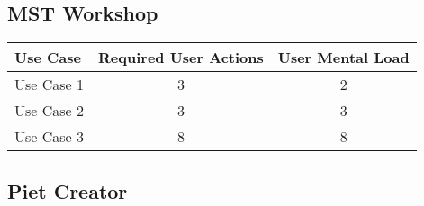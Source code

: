 \subsection{MST Workshop}




\begin{tabularx}{\textwidth}{Xcc}
\textbf{Use Case} & \textbf{Required User Actions} & \textbf{User Mental Load}\\
\hline
Use Case 1                          & 3 & 2 \\
Use Case 2                          & 3 & 3 \\
Use Case 3                          & 8 & 8
\end{tabularx}

\subsection{Piet Creator}



